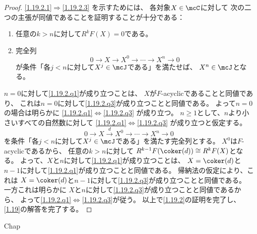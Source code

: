 \documentclass[uplatex,dvipdfmx]{jsarticle}
\begin{document}
\begin{proof}
  \ref{1.19.2.1}\(\Rightarrow\)\ref{1.19.2.3}
  を示すためには、
  各対象\(X\in \mcC\)に対して
  次の二つの主張が同値であることを証明することが十分である：
  \begin{enumerate}[label=(\Alph*),start=3]
    \item \label{1.19.2.q1}
    任意の\(k > n\)に対して\(R^kF(X) = 0\)である。
    \item \label{1.19.2.q3}
    完全列
    \[
    0 \to X \to X^0 \to \cdots \to X^n \to 0
    \]
    が条件「各\(j < n\)に対して\(X^j\in \mcJ\)である」を満たせば、
    \(X^n\in \mcJ\)となる。
  \end{enumerate}
  \(n=0\)に対して\ref{1.19.2.q1}が成り立つことは、
  \(X\)が\(F\)-acyclicであることと同値であり、
  これは\(n=0\)に対して\ref{1.19.2.q3}が成り立つことと同値である。
  よって\(n=0\)の場合は明らかに
  \ref{1.19.2.q1}\(\Leftrightarrow\)\ref{1.19.2.q3}
  が成り立つ。
  \(n\geq 1\)として、\(n\)より小さいすべての自然数に対して
  \ref{1.19.2.q1}\(\Leftrightarrow\)\ref{1.19.2.q3}
  が成り立つと仮定する。
  \[
  0 \to X \xrightarrow{d} X^0 \to \cdots \to X^n \to 0
  \]
  を条件「各\(j < n\)に対して\(X^j\in \mcJ\)である」を満たす完全列とする。
  \(X^0\)は\(F\)-acyclicであるから、
  任意の\(k > n\)に対して
  \(R^{k-1}F(\coker(d)) \cong R^kF(X)\)となる。
  よって、\(X\)と\(n\)に対して\ref{1.19.2.q1}が成り立つことは、
  \(X=\coker(d)\)と\(n-1\)に対して\ref{1.19.2.q1}が成り立つことと同値である。
  帰納法の仮定により、これは
  \(X=\coker(d)\)と\(n-1\)に対して\ref{1.19.2.q3}が成り立つことと同値である。
  一方これは明らかに
  \(X\)と\(n\)に対して\ref{1.19.2.q3}が成り立つことと同値であるから、
  よって\ref{1.19.2.q1}\(\Leftrightarrow\)\ref{1.19.2.q3}が従う。
  以上で\ref{1.19.2}の証明を完了し、
  \autoref{1.19}の解答を完了する。
\end{proof}



\ifcsname Chap\endcsname\else
\printbibliography
\end{document}
